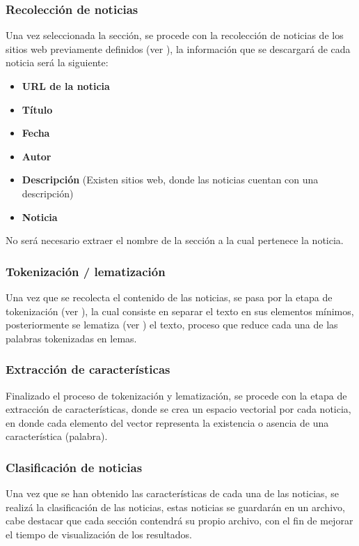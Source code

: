 \subsubsection{Recolección de noticias}
Una vez seleccionada la sección, se procede con la recolección de noticias de los sitios web previamente definidos (ver ), la información que se descargará de cada noticia será la siguiente:

\begin{itemize}
	\item \textbf{URL de la noticia}
	\item \textbf{Título}
	\item \textbf{Fecha}
	\item \textbf{Autor}
	\item \textbf{Descripción} (Existen sitios web, donde las noticias cuentan con una descripción)
	\item \textbf{Noticia}
\end{itemize}

No será necesario extraer el nombre de la sección a la cual pertenece la noticia.\\

\subsubsection{Tokenización / lematización}
Una vez que se recolecta el contenido de las noticias, se pasa por la etapa de tokenización (ver ), la cual consiste en separar el texto en sus elementos mínimos, posteriormente se lematiza (ver ) el texto, proceso que reduce cada una de las palabras tokenizadas en lemas.


\subsubsection{Extracción de características}
Finalizado el proceso de tokenización y lematización, se procede con la etapa de extracción de características, donde se crea un espacio vectorial por cada noticia, en donde cada elemento del vector representa la existencia o asencia de una característica (palabra).

\subsubsection{Clasificación de noticias}
Una vez que se han obtenido las características de cada una de las noticias, se realizá la clasificación de las noticias, estas noticias se guardarán en un archivo, cabe destacar que cada sección contendrá su propio archivo, con el fin de mejorar el tiempo de visualización de los resultados.

